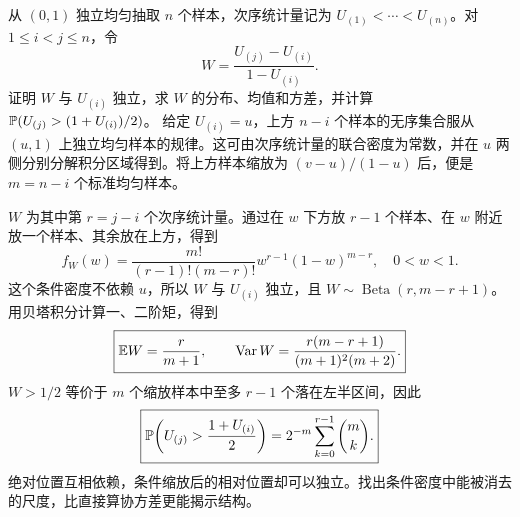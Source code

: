 从 $(0,1)$ 独立均匀抽取 $n$ 个样本，次序统计量记为 $U_{(1)}<\cdots<U_{(n)}$。对 $1\le i<j\le n$，令
\[
W=\frac{U_{(j)}-U_{(i)}}{1-U_{(i)}}.
\]
证明 $W$ 与 $U_{(i)}$ 独立，求 $W$ 的分布、均值和方差，并计算 $\mathbb{P}(U_{(j)}>(1+U_{(i)})/2)$。
\solution 给定 $U_{(i)}=u$，上方 $n-i$ 个样本的无序集合服从 $(u,1)$ 上独立均匀样本的规律。这可由次序统计量的联合密度为常数，并在 $u$ 两侧分别分解积分区域得到。将上方样本缩放为 $(v-u)/(1-u)$ 后，便是 $m=n-i$ 个标准均匀样本。

$W$ 为其中第 $r=j-i$ 个次序统计量。通过在 $w$ 下方放 $r-1$ 个样本、在 $w$ 附近放一个样本、其余放在上方，得到
\[
f_W(w)=\frac{m!}{(r-1)!(m-r)!}
 w^{r-1}(1-w)^{m-r},\quad0<w<1.
\]
这个条件密度不依赖 $u$，所以 $W$ 与 $U_{(i)}$ 独立，且 $W\sim\operatorname{Beta}(r,m-r+1)$。用贝塔积分计算一、二阶矩，得到
\[
\boxed{\mathbb{E} W=\frac r{m+1},\qquad
\operatorname{Var} W=\frac{r(m-r+1)}{(m+1)^2(m+2)}.}
\]
$W>1/2$ 等价于 $m$ 个缩放样本中至多 $r-1$ 个落在左半区间，因此
\[
\boxed{\mathbb{P}\!\left(U_{(j)}>\frac{1+U_{(i)}}2\right)
=2^{-m}\sum_{k=0}^{r-1}\binom mk.}
\]
\insight 绝对位置互相依赖，条件缩放后的相对位置却可以独立。找出条件密度中能被消去的尺度，比直接算协方差更能揭示结构。
